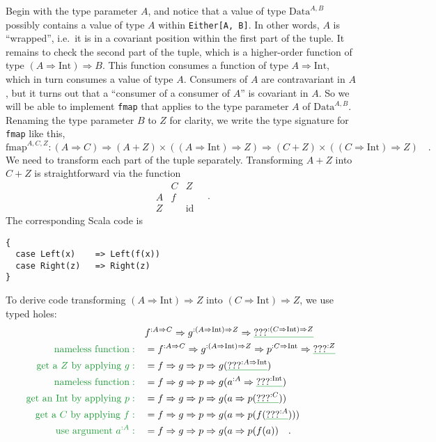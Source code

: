 Begin with the type parameter $A$, and notice that a value of type
$\text{Data}^{A,B}$ possibly contains a value of type $A$ within
\lstinline!Either[A, B]!. In other words, $A$ is ``wrapped'',
i.e.~it is in a covariant position within the first part of the tuple.
It remains to check the second part of the tuple, which is a higher-order
function of type $\left(A\Rightarrow\text{Int}\right)\Rightarrow B$.
This function consumes a function of type $A\Rightarrow\text{Int}$,
which in turn consumes a value of type $A$. Consumers of $A$ are
contravariant in $A$, but it turns out that a ``consumer of a consumer
of $A$'' is covariant in $A$. So we will be able to implement \lstinline!fmap!
that applies to the type parameter $A$ of $\text{Data}^{A,B}$. Renaming
the type parameter $B$ to $Z$ for clarity, we write the type signature
for \lstinline!fmap! like this,
\[
\text{fmap}^{A,C,Z}:\left(A\Rightarrow C\right)\Rightarrow\left(A+Z\right)\times\left(\left(A\Rightarrow\text{Int}\right)\Rightarrow Z\right)\Rightarrow\left(C+Z\right)\times\left(\left(C\Rightarrow\text{Int}\right)\Rightarrow Z\right)\quad.
\]
We need to transform each part of the tuple separately. Transforming
$A+Z$ into $C+Z$ is straightforward via the function
\[
\begin{array}{|c||cc|}
 & C & Z\\
\hline A & f & \\
Z &  & \text{id}
\end{array}\quad.
\]
The corresponding Scala code is
\begin{lstlisting}
{
  case Left(x)    => Left(f(x))
  case Right(z)   => Right(z)
}
\end{lstlisting}
To derive code transforming $\left(A\Rightarrow\text{Int}\right)\Rightarrow Z$
into $\left(C\Rightarrow\text{Int}\right)\Rightarrow Z$, we use typed
holes:
\begin{align*}
 & f^{:A\Rightarrow C}\Rightarrow g^{:\left(A\Rightarrow\text{Int}\right)\Rightarrow Z}\Rightarrow\gunderline{\text{???}^{:\left(C\Rightarrow\text{Int}\right)\Rightarrow Z}}\\
{\color{greenunder}\text{nameless function}:}\quad & =f^{:A\Rightarrow C}\Rightarrow g^{:\left(A\Rightarrow\text{Int}\right)\Rightarrow Z}\Rightarrow p^{:C\Rightarrow\text{Int}}\Rightarrow\gunderline{\text{???}^{:Z}}\\
{\color{greenunder}\text{get a }Z\text{ by applying }g:}\quad & =f\Rightarrow g\Rightarrow p\Rightarrow g(\gunderline{\text{???}^{:A\Rightarrow\text{Int}}})\\
{\color{greenunder}\text{nameless function}:}\quad & =f\Rightarrow g\Rightarrow p\Rightarrow g(a^{:A}\Rightarrow\gunderline{\text{???}^{:\text{Int}}})\\
{\color{greenunder}\text{get an Int by applying }p:}\quad & =f\Rightarrow g\Rightarrow p\Rightarrow g(a\Rightarrow p(\gunderline{\text{???}^{:C}}))\\
{\color{greenunder}\text{get a }C\text{ by applying }f:}\quad & =f\Rightarrow g\Rightarrow p\Rightarrow g(a\Rightarrow p(f(\gunderline{\text{???}^{:A}})))\\
{\color{greenunder}\text{use argument }a^{:A}:}\quad & =f\Rightarrow g\Rightarrow p\Rightarrow g(a\Rightarrow p(f(a))\quad.
\end{align*}
